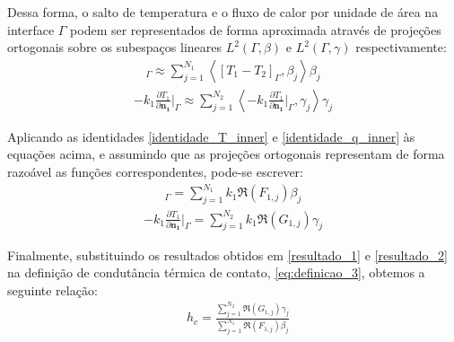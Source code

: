 Dessa forma, o salto de temperatura e o fluxo de calor por unidade de área na interface $\Gamma$ podem ser representados de forma aproximada através de projeções
ortogonais sobre os subespaços lineares $L^2(\Gamma, \beta)$ e $L^2(\Gamma, \gamma)$ respectivamente:
\begin{align}
[T_1 - T_2]_\Gamma \approx \sum_{j=1}^{N_1} \left\langle  \left[T_1 - T_2\right]_\Gamma, \beta_j \right\rangle \beta_j
\end{align}
\begin{align}
	- k_1 \frac{\partial T_1}{\partial\mathbf{n_1}}\bigg|_\Gamma \approx \sum_{j=1}^{N_2} \left\langle  -k_1 \frac{\partial T_1}{\partial\mathbf{n_1}}\bigg|_\Gamma, \gamma_j \right\rangle \gamma_j
\end{align}

Aplicando as identidades \eqref{identidade_T_inner} e \eqref{identidade_q_inner} às equações acima, e assumindo que as projeções ortogonais representam
de forma razoável as funções correspondentes, pode-se escrever:
\begin{align}
	[T_1 - T_2]_\Gamma = \sum_{j=1}^{N_1} k_1 \Re(F_{1,j}) \beta_j \label{resultado_1}
\end{align}
\begin{align}
	- k_1 \frac{\partial T_1}{\partial\mathbf{n_1}}\bigg|_\Gamma = \sum_{j=1}^{N_2} k_1 \Re(G_{1,j}) \gamma_j \label{resultado_2}
\end{align}

Finalmente, substituindo os resultados obtidos em \eqref{resultado_1} e \eqref{resultado_2} na definição de condutância térmica de contato,
\eqref{eq:definicao_3}, obtemos a seguinte relação:
\begin{align}
	& h_c %
	= \frac{\displaystyle\sum_{j=1}^{N_2} \Re(G_{1,j}) \gamma_j}{\displaystyle\sum_{j=1}^{N_1} \Re(F_{1,j}) \beta_j}
	\label{equacao_definicao_f_r}
\end{align}


